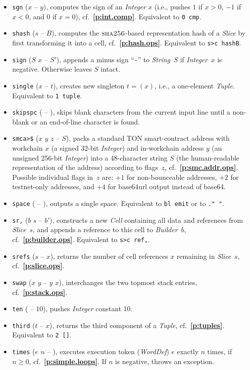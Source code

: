 \documentclass[12pt,oneside]{article}
\def\refpoint#1{{\rm\textbf{\ref{#1}}}}
\let\ptref=\refpoint
\def\opsc#1{\operatorname{\textsc{#1}}}
\def\Sha{\opsc{sha256}}
\begin{document}
\begin{itemize}
\item {\tt sgn} ($x$ -- $y$), computes the sign of an {\em Integer\/} $x$ (i.e., pushes $1$ if $x>0$, $-1$ if $x<0$, and $0$ if $x=0$), cf.~\ptref{p:int.comp}. Equivalent to {\tt 0 cmp}.
\item {\tt shash} ($s$ -- $B$), computes the $\Sha$-based representation hash of a {\em Slice\/} by first transforming it into a cell, cf.~\ptref{p:hash.ops}. Equivalent to {\tt s>c hashB}.
\item {\tt sign} ($S$ $x$ -- $S'$), appends a minus sign ``{\tt -}'' to {\em String\/}~$S$ if {\em Integer\/}~$x$ is negative. Otherwise leaves $S$ intact.
\item {\tt single} ($x$ -- $t$), creates new singleton $t=(x)$, i.e., a one-element {\em Tuple}. Equivalent to {\tt 1 tuple}.
\item {\tt skipspc} ( -- ), skips blank characters from the current input line until a non-blank or an end-of-line character is found.
\item {\tt smca>\$} ($x$ $y$ $z$ -- $S$), packs a standard TON smart-contract address with workchain $x$ (a signed 32-bit {\em Integer\/}) and in-workchain address $y$ (an unsigned 256-bit {\em Integer\/}) into a 48-character string $S$ (the human-readable representation of the address) according to flags~$z$, cf.~\ptref{p:smc.addr.ops}. Possible individual flags in~$z$ are: $+1$ for non-bounceable addresses, $+2$ for testnet-only addresses, and $+4$ for base64url output instead of base64.
\item {\tt space} ( -- ), outputs a single space. Equivalent to {\tt bl emit} or to {\tt ." "}.
\item {\tt sr,} ($b$ $s$ -- $b'$), constructs a new {\em Cell\/} containing all data and references from {\em Slice\/}~$s$, and appends a reference to this cell to {\em Builder}~$b$, cf.~\ptref{p:builder.ops}. Equivalent to {\tt s>c ref,}.
\item {\tt srefs} ($s$ -- $x$), returns the number of cell references $x$ remaining in {\em Slice}~$s$, cf.~\ptref{p:slice.ops}.
\item {\tt swap} ($x$ $y$ -- $y$ $x$), interchanges the two topmost stack entries, cf.~\ptref{p:stack.ops}.
\item {\tt ten} ( -- $10$), pushes {\em Integer\/} constant 10.
\item {\tt third} ($t$ -- $x$), returns the third component of a {\em Tuple}, cf.~\ptref{p:tuples}. Equivalent to {\tt 2 []}.
\item {\tt times} ($e$ $n$ -- ), executes execution token ({\em WordDef\/}) $e$ exactly $n$ times, if $n\geq0$, cf.~\ptref{p:simple.loops}. If $n$ is negative, throws an exception.

\end{itemize}
\end{document}
